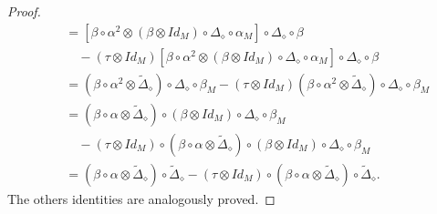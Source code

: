 \documentclass{article}
\theoremstyle{definition}
\theoremstyle{remark}
\numberwithin{equation}{section}
\begin{document}
\begin{proof}
\begin{eqnarray}
&&=[\beta\circ\alpha^2\otimes(\beta\otimes Id_M)\circ\Delta_\diamond\circ\alpha_M]\circ\Delta_\diamond\circ\beta\nonumber\\
&&\quad-(\tau\otimes Id_M)[\beta\circ\alpha^2\otimes(\beta\otimes Id_M)\circ\Delta_\diamond\circ\alpha_M]\circ\Delta_\diamond\circ\beta\nonumber\\
&&=(\beta\circ\alpha^2\otimes\tilde\Delta_\diamond)\circ\Delta_\diamond\circ\beta_M
-(\tau\otimes Id_M)(\beta\circ\alpha^2\otimes\tilde\Delta_\diamond)\circ\Delta_\diamond\circ\beta_M\nonumber\\
&&=(\beta\circ\alpha\otimes\tilde\Delta_\diamond)\circ(\beta\otimes Id_M)\circ\Delta_\diamond\circ\beta_M\nonumber\\
&&\quad-(\tau\otimes Id_M)\circ(\beta\circ\alpha\otimes\tilde\Delta_\diamond)\circ(\beta\otimes Id_M)\circ\Delta_\diamond\circ\beta_M\nonumber\\
&&=
(\beta\circ\alpha\otimes\tilde\Delta_\diamond)\circ\tilde\Delta_\diamond
-(\tau\otimes Id_M)\circ(\beta\circ\alpha\otimes\tilde\Delta_\diamond)\circ\tilde\Delta_\diamond\nonumber.
\end{eqnarray}
The others identities are analogously proved.
\end{proof}
\end{document}
